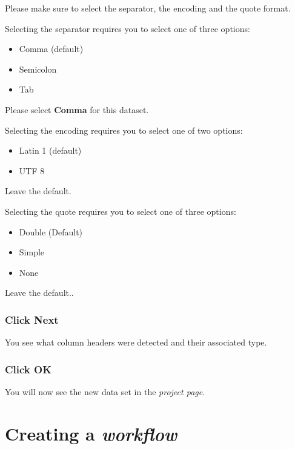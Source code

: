 \documentclass[]{book}
\providecommand{\tightlist}{%
  \setlength{\itemsep}{0pt}\setlength{\parskip}{0pt}}
\theoremstyle{definition}
\theoremstyle{definition}
\theoremstyle{remark}
\begin{document}
Please make sure to select the separator, the encoding and the quote
format.

Selecting the separator requires you to select one of three options:

\begin{itemize}
\tightlist
\item
  Comma (default)
\item
  Semicolon
\item
  Tab
\end{itemize}

Please select \textbf{Comma} for this dataset.

Selecting the encoding requires you to select one of two options:

\begin{itemize}
\tightlist
\item
  Latin 1 (default)
\item
  UTF 8
\end{itemize}

Leave the default.

Selecting the quote requires you to select one of three options:

\begin{itemize}
\tightlist
\item
  Double (Default)
\item
  Simple
\item
  None
\end{itemize}

Leave the default..

\subsubsection{\texorpdfstring{Click
\textbf{Next}}{Click Next}}\label{click-next}

You see what column headers were detected and their associated type.

\subsubsection{\texorpdfstring{Click
\textbf{OK}}{Click OK}}\label{click-ok}

You will now see the new data set in the \emph{project page}.

\section{\texorpdfstring{Creating a
\emph{workflow}}{Creating a workflow}}\label{creating-a-workflow}
\end{document}
